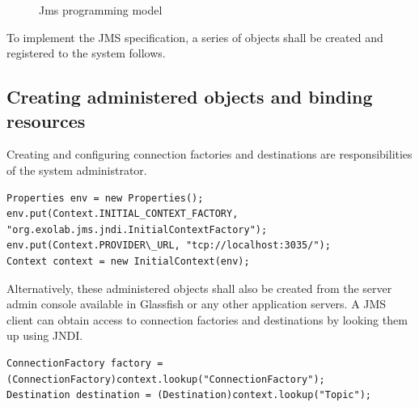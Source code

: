 \documentclass[9pt,twocolumn,twoside]{styles/osajnl}
\begin{document}
\begin{figure}[htbp]
\centering
{}
\caption{\cite{www-jms-fischli-article} Jms programming model}
\label{fig:JMS Programming Objects}
\end{figure}

To implement the JMS specification, a series of objects shall be
created and registered to the system follows.

\subsection{Creating administered objects and binding resources}

Creating and configuring connection factories and destinations are
responsibilities of the system administrator.

\begin{lstlisting}
Properties env = new Properties();
env.put(Context.INITIAL_CONTEXT_FACTORY,
"org.exolab.jms.jndi.InitialContextFactory");
env.put(Context.PROVIDER\_URL, "tcp://localhost:3035/");
Context context = new InitialContext(env);
\end{lstlisting}

Alternatively, these administered objects shall also be created from
the server admin console available in Glassfish or any other
application servers.  A JMS client can obtain access to connection
factories and destinations by looking them up using JNDI.

\begin{lstlisting}
ConnectionFactory factory =
(ConnectionFactory)context.lookup("ConnectionFactory"); 
Destination destination = (Destination)context.lookup("Topic");
\end{lstlisting}
\end{document}
